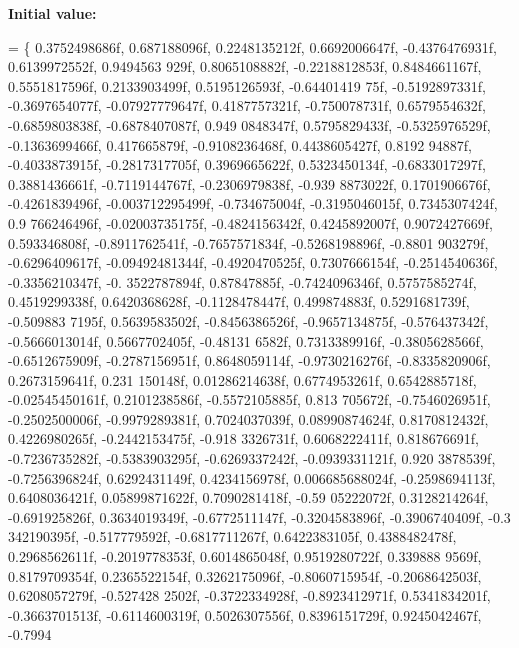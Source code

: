 {\bfseries Initial value\+:}
\begin{DoxyCode}
=
    \{
        0.3752498686f, 0.687188096f, 0.2248135212f, 0.6692006647f, -0.4376476931f, 0.6139972552f, 0.9494563
      929f, 0.8065108882f, -0.2218812853f, 0.8484661167f, 0.5551817596f, 0.2133903499f, 0.5195126593f, -0.64401419
      75f, -0.5192897331f, -0.3697654077f,
        -0.07927779647f, 0.4187757321f, -0.750078731f, 0.6579554632f, -0.6859803838f, -0.6878407087f, 0.949
      0848347f, 0.5795829433f, -0.5325976529f, -0.1363699466f, 0.417665879f, -0.9108236468f, 0.4438605427f, 0.8192
      94887f, -0.4033873915f, -0.2817317705f,
        0.3969665622f, 0.5323450134f, -0.6833017297f, 0.3881436661f, -0.7119144767f, -0.2306979838f, -0.939
      8873022f, 0.1701906676f, -0.4261839496f, -0.003712295499f, -0.734675004f, -0.3195046015f, 0.7345307424f, 0.9
      766246496f, -0.02003735175f, -0.4824156342f,
        0.4245892007f, 0.9072427669f, 0.593346808f, -0.8911762541f, -0.7657571834f, -0.5268198896f, -0.8801
      903279f, -0.6296409617f, -0.09492481344f, -0.4920470525f, 0.7307666154f, -0.2514540636f, -0.3356210347f, -0.
      3522787894f, 0.87847885f, -0.7424096346f,
        0.5757585274f, 0.4519299338f, 0.6420368628f, -0.1128478447f, 0.499874883f, 0.5291681739f, -0.509883
      7195f, 0.5639583502f, -0.8456386526f, -0.9657134875f, -0.576437342f, -0.5666013014f, 0.5667702405f, -0.48131
      6582f, 0.7313389916f, -0.3805628566f,
        -0.6512675909f, -0.2787156951f, 0.8648059114f, -0.9730216276f, -0.8335820906f, 0.2673159641f, 0.231
      150148f, 0.01286214638f, 0.6774953261f, 0.6542885718f, -0.02545450161f, 0.2101238586f, -0.5572105885f, 0.813
      705672f, -0.7546026951f, -0.2502500006f,
        -0.9979289381f, 0.7024037039f, 0.08990874624f, 0.8170812432f, 0.4226980265f, -0.2442153475f, -0.918
      3326731f, 0.6068222411f, 0.818676691f, -0.7236735282f, -0.5383903295f, -0.6269337242f, -0.0939331121f, 0.920
      3878539f, -0.7256396824f, 0.6292431149f,
        0.4234156978f, 0.006685688024f, -0.2598694113f, 0.6408036421f, 0.05899871622f, 0.7090281418f, -0.59
      05222072f, 0.3128214264f, -0.691925826f, 0.3634019349f, -0.6772511147f, -0.3204583896f, -0.3906740409f, -0.3
      342190395f, -0.517779592f, -0.6817711267f,
        0.6422383105f, 0.4388482478f, 0.2968562611f, -0.2019778353f, 0.6014865048f, 0.9519280722f, 0.339888
      9569f, 0.8179709354f, 0.2365522154f, 0.3262175096f, -0.8060715954f, -0.2068642503f, 0.6208057279f, -0.527428
      2502f, -0.3722334928f, -0.8923412971f,
        0.5341834201f, -0.3663701513f, -0.6114600319f, 0.5026307556f, 0.8396151729f, 0.9245042467f, -0.7994

\end{DoxyCode}

